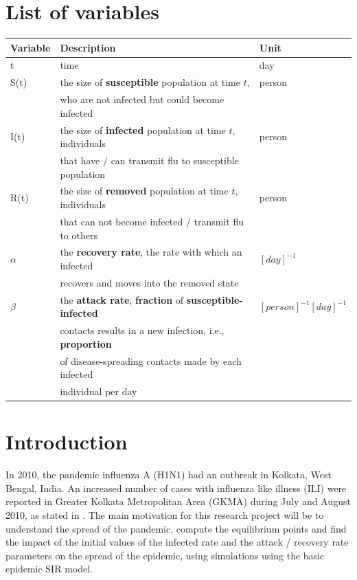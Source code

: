 \documentclass[11pt, a4paper, twoside]{report}
\begin{document}
\chapter*{List of variables}

\begin{table}[H]

\begin{tabular}{| l | l | l |}

\hline
Variable &  Description & Unit \\ \hline
t & time & day \\ \hline
S(t) & the size of \textbf{susceptible} population at time $t$,  & person \\   
      & who are not infected but could become infected &  \\ \hline
I(t) & the size of \textbf{infected} population at time $t$, individuals  & person \\       & that have / can transmit flu to susceptible population & \\ \hline
R(t) & the size of \textbf{removed} population at time $t$, individuals  & person \\
     & that can not become infected / transmit flu to others &  \\ \hline
$\alpha$ & the \textbf{recovery rate}, the rate with which an infected & $[day]^{-1}$ \\
     & recovers and moves into the removed state &   \\ \hline
$\beta$ & the \textbf{attack rate}, \textbf{fraction} of \textbf{susceptible-infected} & $[person]^{-1}[day]^{-1}$ \\ 
     & contacts results in a new infection, i.e., \textbf{proportion} & \\  
     & of disease-spreading contacts made by each infected &  \\ 
     & individual per day & \\
\hline

\end{tabular}

\end{table}


\chapter{Introduction} %
In 2010, the pandemic influenza A (H1N1) had an outbreak in Kolkata, West Bengal, India. An increased number of cases with influenza like illness (ILI) were reported in Greater Kolkata Metropolitan Area (GKMA) during July and August 2010, as stated in \cite{bib:ijmr}. The main motivation for this research project will be to understand the spread of the pandemic, compute the equilibrium points and find the impact of the initial values of the infected rate and the attack / recovery rate parameters on the spread of the epidemic, using simulations using the basic epidemic SIR model.
\end{document}
